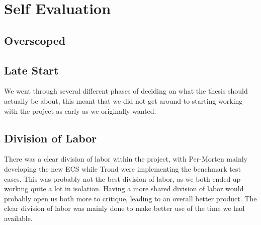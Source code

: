 \section{Self Evaluation}

\subsection{Overscoped}

\subsection{Late Start}
We went through several different phases of deciding on what the thesis should actually be about,
this meant that we did not get around to starting working with the project as early as we originally
wanted.

\subsection{Division of Labor}
There was a clear division of labor within the project, with Per-Morten mainly developing
the new ECS while Trond were implementing the benchmark test cases.
This was probably not the best division of labor,
as we both ended up working quite a lot in isolation.
Having a more shared division of labor would probably open us both more to critique,
leading to an overall better product.
The clear division of labor was mainly done to make better use of the time we had available.


